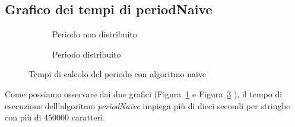 \documentclass[a4paper,titlepage]{article}
\begin{document}
\subsection{Grafico dei tempi di periodNaive}

\begin{figure}[h]
  \centering
  \begin{subfigure}{\textwidth}
     \captionsetup{justification=centering}
     \caption{Periodo non distribuito}
     \label{fig:naive}
  \end{subfigure}%
  \vspace{2pt}
  \begin{subfigure}{\textwidth}
     \captionsetup{justification=centering}
     \caption{Periodo distribuito}
     \label{fig:naive_dist}
  \end{subfigure}
  \caption{Tempi di calcolo del periodo con algoritmo naive}
\end{figure}
Come possiamo osservare dai due grafici (Figura~\ref{fig:naive} e Figura~\ref{fig:naive_dist} ), il tempo di esecuzione dell’algoritmo \textit{periodNaive} impiega più di dieci secondi per stringhe con più di 450000 caratteri.
\newpage
\end{document}
